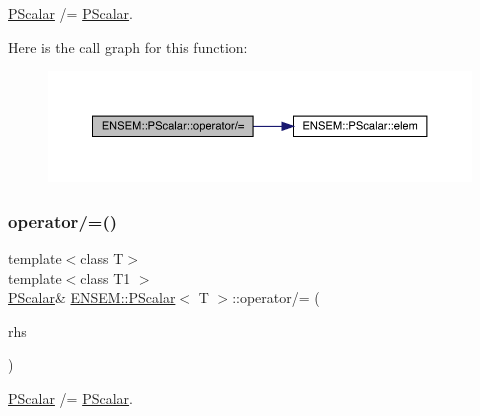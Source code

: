 \mbox{\hyperlink{classENSEM_1_1PScalar}{P\+Scalar}} /= \mbox{\hyperlink{classENSEM_1_1PScalar}{P\+Scalar}}. 

Here is the call graph for this function\+:
\nopagebreak
\begin{figure}[H]
\begin{center}
\leavevmode
\includegraphics[width=350pt]{d3/d27/classENSEM_1_1PScalar_a72bf5e7494fc6c8831d0003f8fb62a16_cgraph}
\end{center}
\end{figure}
\mbox{\label{classENSEM_1_1PScalar_a72bf5e7494fc6c8831d0003f8fb62a16}} 
\subsubsection{\texorpdfstring{operator/=()}{operator/=()}\hspace{0.1cm}{\footnotesize\ttfamily [2/3]}}
{\footnotesize\ttfamily template$<$class T$>$ \\
template$<$class T1 $>$ \\
\mbox{\hyperlink{classENSEM_1_1PScalar}{P\+Scalar}}\& \mbox{\hyperlink{classENSEM_1_1PScalar}{E\+N\+S\+E\+M\+::\+P\+Scalar}}$<$ T $>$\+::operator/= (\begin{DoxyParamCaption}\item[{const \mbox{\hyperlink{classENSEM_1_1PScalar}{P\+Scalar}}$<$ T1 $>$ \&}]{rhs }\end{DoxyParamCaption})\hspace{0.3cm}{\ttfamily [inline]}}



\mbox{\hyperlink{classENSEM_1_1PScalar}{P\+Scalar}} /= \mbox{\hyperlink{classENSEM_1_1PScalar}{P\+Scalar}}. 

